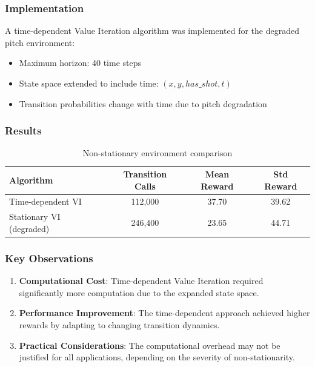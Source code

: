 \documentclass[10pt,a4paper]{article}
\begin{document}
\subsubsection{Implementation}

A time-dependent Value Iteration algorithm was implemented for the degraded pitch environment:
\begin{itemize}
    \item Maximum horizon: 40 time steps
    \item State space extended to include time: $(x, y, has\_shot, t)$
    \item Transition probabilities change with time due to pitch degradation
\end{itemize}

\subsubsection{Results}

\begin{table}[H]
\centering
\caption{Non-stationary environment comparison}
\begin{tabular}{lccc}
\toprule
Algorithm & Transition Calls & Mean Reward & Std Reward \\
\midrule
Time-dependent VI & 112,000 & 37.70 & 39.62 \\
Stationary VI (degraded) & 246,400 & 23.65 & 44.71 \\
\bottomrule
\end{tabular}
\end{table}

\subsubsection{Key Observations}

\begin{enumerate}
    \item \textbf{Computational Cost}: Time-dependent Value Iteration required significantly more computation due to the expanded state space.
    
    \item \textbf{Performance Improvement}: The time-dependent approach achieved higher rewards by adapting to changing transition dynamics.
    
    \item \textbf{Practical Considerations}: The computational overhead may not be justified for all applications, depending on the severity of non-stationarity.
\end{enumerate}
\end{document}
